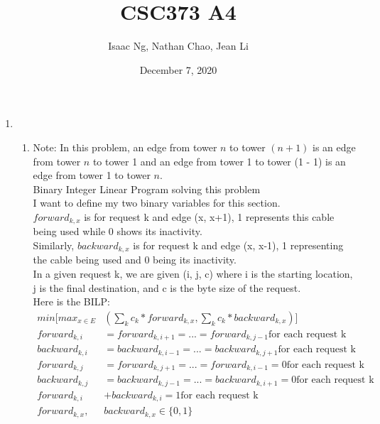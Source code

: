 \documentclass{article}
\title{CSC373 A4}
\author{Isaac Ng, Nathan Chao, Jean Li}
\date{December 7, 2020}
\begin{document}
\maketitle
\begin{enumerate}
    \item  
    \begin{enumerate}
        \item Note: In this problem, an edge from tower $n$ to tower $(n + 1)$ is an edge from tower $n$ to tower 1 and an edge from tower 1 to tower (1 - 1) is an edge from tower 1 to tower $n$.\\Binary Integer Linear Program solving this problem\\
        I want to define my two binary variables for this section.\\
        $forward_{k, x}$ is for request k and edge (x, x+1), 1 represents this cable being used while 0 shows its inactivity.\\
        Similarly, $backward_{k, x}$ is for request k and edge (x, x-1), 1 representing the cable being used and 0 being its inactivity.\\
        In a given request k, we are given (i, j, c) where i is the starting location, j is the final destination, and c is the byte size of the request.\\
        Here is the BILP:
        \begin{align*}
            min [ max_{x \in E} &( \sum_k c_k * forward_{k,x}, \sum_k c_k * backward_{k,x} ) ]\\
                forward_{k,i} &= forward_{k,i+1} = ... = forward_{k,j-1} \text{for each request k} \tag{1}\\
                backward_{k,i} &= backward_{k,i-1} = ... = backward_{k,j+1} \text{for each request k} \tag{2}\\
                forward_{k,j} &= forward_{k,j+1} = ... = forward_{k,i-1} = 0 \text{for each request k} \tag{3}\\
                backward_{k,j} &= backward_{k,j-1} = ... = backward_{k,i+1} = 0 \text{for each request k} \tag{4}\\
                forward_{k, i} &+ backward_{k,i} = 1 \tag{5} \text{for each request k} \\
                forward_{k,x}, &backward_{k,x} \in \{0, 1\} \tag{$\forall k, x$}
        \end{align*}
        

\end{enumerate}
\end{enumerate}
\end{document}
